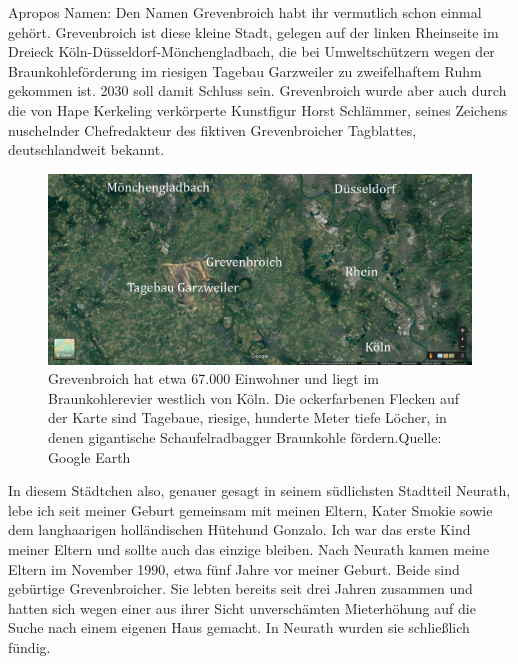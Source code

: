 \documentclass[fontsize=14pt,a4paper,headinclude,DIV=calc,automark]{scrbook}
\begin{document}
Apropos Namen: Den Namen Grevenbroich habt ihr vermutlich schon einmal gehört. Grevenbroich ist diese kleine Stadt, gelegen auf der linken Rheinseite im Dreieck Köln-Düsseldorf-Mönchengladbach, die bei Umweltschützern wegen der Braunkohleförderung im riesigen Tagebau Garzweiler zu zweifelhaftem Ruhm gekommen ist. 2030 soll damit Schluss sein. Grevenbroich wurde aber auch durch die von Hape Kerkeling verkörperte Kunstfigur Horst Schlämmer, seines Zeichens nuschelnder Chefredakteur des fiktiven Grevenbroicher Tagblattes, deutschlandweit bekannt.


\begin{figure}[ht]
    \centering
    \includegraphics[width=\textwidth]{Fotos/grevenbroich.jpg}
    \caption{Grevenbroich hat etwa 67.000 Einwohner und liegt im Braunkohlerevier westlich von Köln. Die ockerfarbenen Flecken auf der Karte sind Tagebaue, riesige, hunderte Meter tiefe Löcher, in denen gigantische Schaufelradbagger Braunkohle fördern.\hfill Quelle: Google Earth}
    \label{fig:grevenbroich}
\end{figure}

In diesem Städtchen also, genauer gesagt in seinem südlichsten Stadtteil Neurath, lebe ich seit meiner Geburt gemeinsam mit meinen Eltern, Kater Smokie sowie dem langhaarigen holländischen Hütehund Gonzalo. Ich war das erste Kind meiner Eltern und sollte auch das einzige bleiben. Nach Neurath kamen meine Eltern im November 1990, etwa fünf Jahre vor meiner Geburt. Beide sind gebürtige Grevenbroicher. Sie lebten bereits seit drei Jahren zusammen und hatten sich wegen einer aus ihrer Sicht unverschämten Mieterhöhung auf die Suche nach einem eigenen Haus gemacht. In Neurath wurden sie schließlich fündig.
\end{document}
